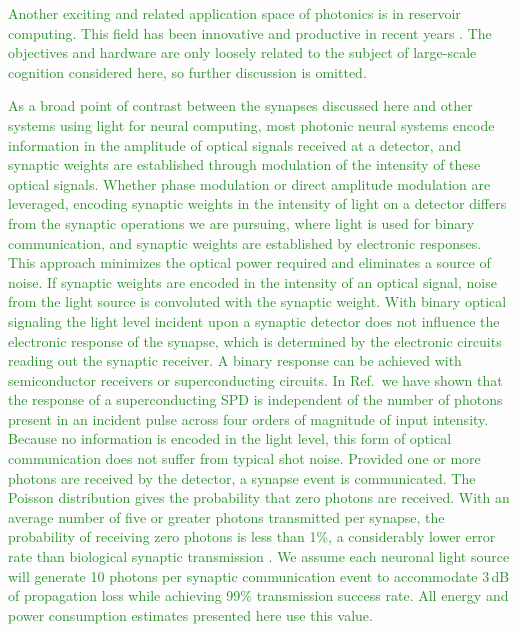 \documentclass[twocolumn]{article}
\newcommand{\onlinecite}[1]{\hspace{-1 ex} \nocite{#1}\citenum{#1}}
\begin{document}
\textcolor{ForestGreen}{Another exciting and related application space of photonics is in reservoir computing. This field has been innovative and productive in recent years \cite{funa1993,vada2011,orso2015,vabr2017,brpe2018}. The objectives and hardware are only loosely related to the subject of large-scale cognition considered here, so further discussion is omitted.} 

\textcolor{ForestGreen}{As a broad point of contrast between the synapses discussed here and other systems using light for neural computing, most photonic neural systems encode information in the amplitude of optical signals received at a detector, and synaptic weights are established through modulation of the intensity of these optical signals. Whether phase modulation or direct amplitude modulation are leveraged, encoding synaptic weights in the intensity of light on a detector differs from the synaptic operations we are pursuing, where light is used for binary communication, and synaptic weights are established by electronic responses. This approach minimizes the optical power required and eliminates a source of noise. If synaptic weights are encoded in the intensity of an optical signal, noise from the light source is convoluted with the synaptic weight. With binary optical signaling the light level incident upon a synaptic detector does not influence the electronic response of the synapse, which is determined by the electronic circuits reading out the synaptic receiver. A binary response can be achieved with semiconductor receivers or superconducting circuits. In Ref.\,\onlinecite{buta2020_2} we have shown that the response of a superconducting SPD is independent of the number of photons present in an incident pulse across four orders of magnitude of input intensity. Because no information is encoded in the light level, this form of optical communication does not suffer from typical shot noise. Provided one or more photons are received by the detector, a synapse event is communicated. The Poisson distribution gives the probability that zero photons are received. With an average number of five or greater photons transmitted per synapse, the probability of receiving zero photons is less than 1\%, a considerably lower error rate than biological synaptic transmission \cite{li1997}. We assume each neuronal light source will generate 10 photons per synaptic communication event to accommodate 3\,dB of propagation loss while achieving 99\% transmission success rate. All energy and power consumption estimates presented here use this value.}
\end{document}
